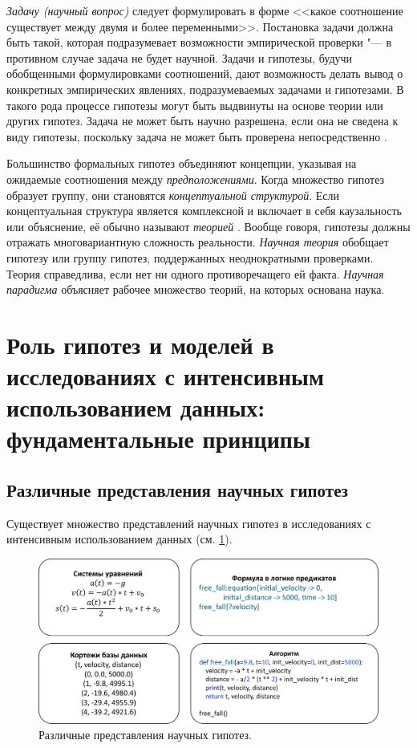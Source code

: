 \textit{Задачу (научный вопрос)} следует формулировать в форме <<какое соотношение существует между двумя и 
более переменными>>. Постановка задачи должна быть такой, которая подразумевает возможности эмпирической 
проверки "--- в противном случае задача не будет научной. Задачи и гипотезы, будучи обобщенными формулировками 
соотношений, дают возможность делать вывод о конкретных эмпирических явлениях, подразумеваемых задачами и гипотезами. 
В такого рода процессе гипотезы могут быть выдвинуты на основе теории или других гипотез. Задача не может быть научно 
разрешена, если она не сведена к виду гипотезы, поскольку задача не может быть проверена 
непосредственно \cite{Azorin1966}.

Большинство формальных гипотез объединяют концепции, указывая на ожидаемые соотношения между \textit{предположениями}. 
Когда множество гипотез образует группу, они становятся \textit{концептуальной структурой}. Если концептуальная 
структура является комплексной и включает в себя каузальность или объяснение, её обычно называют 
\textit{теорией} \cite{Hempel1952}. Вообще говоря, гипотезы должны отражать многовариантную сложность реальности. 
\textit{Научная теория} обобщает гипотезу или группу гипотез, поддержанных неоднократными проверками. Теория 
справедлива, если нет ни одного противоречащего ей факта. \textit{Научная парадигма} объясняет рабочее множество 
теорий, на которых основана наука.

\section{Роль гипотез и моделей в исследованиях с интенсивным 
         использованием данных: фундаментальные принципы}\label{sect1_2}

\subsection{Различные представления научных гипотез}\label{sect1_2_1}
Существует множество представлений научных гипотез в исследованиях 
с интенсивным использованием данных (см. \cref{fig:hypothesis_representation}).

\begin{figure}[ht]
    \centering
    \includegraphics[width=1.0\linewidth]{images/hypothesis_representation.pdf}
    \caption{Различные представления научных гипотез.}\label{fig:hypothesis_representation}
\end{figure}

